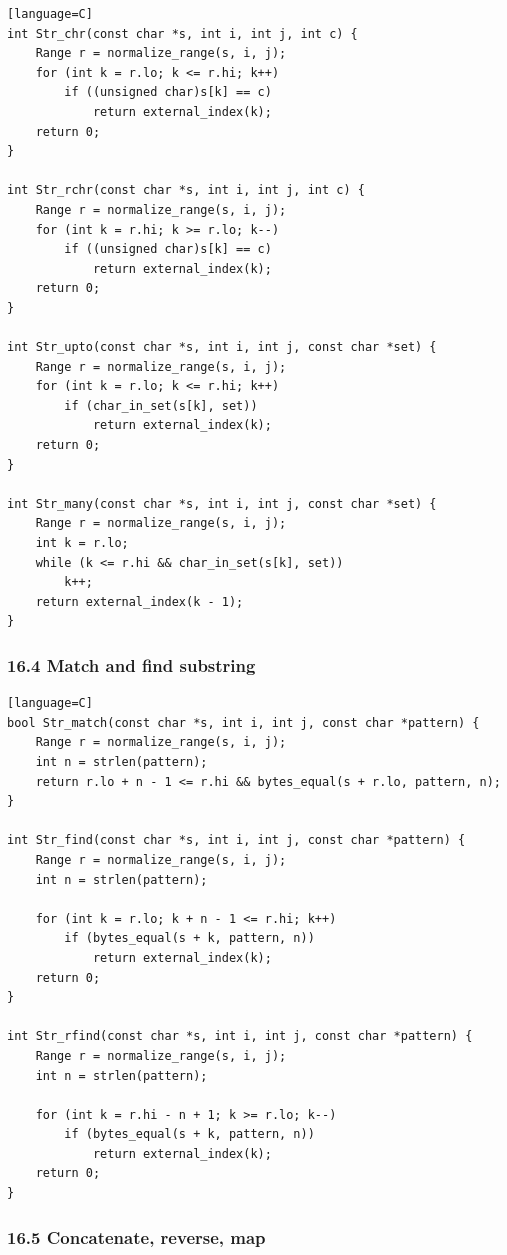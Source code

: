 \documentclass[11pt]{article}
\begin{document}
\begin{verbatim}[language=C]
int Str_chr(const char *s, int i, int j, int c) {
    Range r = normalize_range(s, i, j);
    for (int k = r.lo; k <= r.hi; k++)
        if ((unsigned char)s[k] == c)
            return external_index(k);
    return 0;
}

int Str_rchr(const char *s, int i, int j, int c) {
    Range r = normalize_range(s, i, j);
    for (int k = r.hi; k >= r.lo; k--)
        if ((unsigned char)s[k] == c)
            return external_index(k);
    return 0;
}

int Str_upto(const char *s, int i, int j, const char *set) {
    Range r = normalize_range(s, i, j);
    for (int k = r.lo; k <= r.hi; k++)
        if (char_in_set(s[k], set))
            return external_index(k);
    return 0;
}

int Str_many(const char *s, int i, int j, const char *set) {
    Range r = normalize_range(s, i, j);
    int k = r.lo;
    while (k <= r.hi && char_in_set(s[k], set))
        k++;
    return external_index(k - 1);
}
\end{verbatim}

\subsubsection{16.4 Match and find substring}\label{match-and-find-substring}

\begin{verbatim}[language=C]
bool Str_match(const char *s, int i, int j, const char *pattern) {
    Range r = normalize_range(s, i, j);
    int n = strlen(pattern);
    return r.lo + n - 1 <= r.hi && bytes_equal(s + r.lo, pattern, n);
}

int Str_find(const char *s, int i, int j, const char *pattern) {
    Range r = normalize_range(s, i, j);
    int n = strlen(pattern);

    for (int k = r.lo; k + n - 1 <= r.hi; k++)
        if (bytes_equal(s + k, pattern, n))
            return external_index(k);
    return 0;
}

int Str_rfind(const char *s, int i, int j, const char *pattern) {
    Range r = normalize_range(s, i, j);
    int n = strlen(pattern);

    for (int k = r.hi - n + 1; k >= r.lo; k--)
        if (bytes_equal(s + k, pattern, n))
            return external_index(k);
    return 0;
}
\end{verbatim}

\subsubsection{16.5 Concatenate, reverse, map}\label{concatenate-reverse-map}
\end{document}
